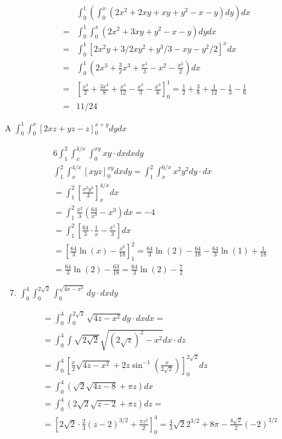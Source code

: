 \documentclass[12pt, a4paper]{article}
\begin{document}
$$
\begin{aligned}
& \int_{0}^{1}\left(\int_{0}^{x}\left(2 x^{2}+2 x y+x y+y^{2}-x-y\right) d y\right) d x \\
= & \int_{0}^{1} \int_{0}^{x}\left(2 x^{2}+3 x y+y^{2}-x-y\right) d y d x \\
= & \int_{0}^{1}\left[2 x^{2} y+3 / 2 x y^{2}+y^{3} / 3-x y-y^{2} / 2\right]^{x} d x \\
= & \int_{0}^{1}\left(2 x^{3}+\frac{3}{2} x^{3}+\frac{x^{3}}{3}-x^{2}-\frac{x^{2}}{2}\right) d x \\
= & {\left[\frac{x^{4}}{2}+\frac{3 x^{4}}{8}+\frac{x^{4}}{12}-\frac{x^{3}}{3}-\frac{x^{3}}{6}\right]_{0}^{1}=\frac{1}{2}+\frac{3}{8}+\frac{1}{12}-\frac{1}{3}-\frac{1}{6} } \\
= & 11 / 24
\end{aligned}
$$

A $\int_{0}^{1} \int_{0}^{x}[2 x z+y z-z]_{0}^{x+y} d y d x$


\begin{align*}
& 6 \int_{1}^{2} \int_{x}^{4 / x} \int_{0}^{x y} x y \cdot d x d x d y \\
& \int_{1}^{2} \int_{x}^{4 / x}[x y z]_{0}^{x y} d x d y=\int_{1}^{2} \int_{x}^{6 / x} x^{2} y^{2} d y \cdot d x \\
&= \int_{1}^{2}\left[\frac{x^{2} y^{3}}{3}\right]_{x}^{4 / x} d x \\
&=\int_{1}^{2} \frac{x^{2}}{3}\left(\frac{64}{x^{3}}-x^{3}\right) d x=-4 \\
&=\int_{1}^{2}\left[\frac{64}{3} \cdot \frac{1}{x}-\frac{x^{5}}{3}\right] d x \\
&=\left[\frac{64}{3} \ln (x)-\frac{x^{6}}{18}\right]_{1}^{2}=\frac{64}{3} \ln (2)-\frac{64}{18}-\frac{64}{3} \ln (1)+\frac{1}{18} \\
&=\frac{64}{3} \ln (2)-\frac{63}{18}=\frac{64}{3} \ln (2)-\frac{7}{2}
\end{align*}


\begin{enumerate}
  \setcounter{enumi}{6}
  \item $\int_{0}^{4} \int_{0}^{2 \sqrt{2}} \int_{0}^{\sqrt{4 x-x^{2}}} d y \cdot d x d y$
\end{enumerate}

$$
\begin{aligned}
& =\int_{0}^{4} \int_{0}^{2 \sqrt{2}} \sqrt{4 z-x^{2}} d y \cdot d x d x= \\
& =\int_{0}^{4} \int \sqrt{2 \sqrt{2}} \sqrt{(2 \sqrt{z})^{2}-x^{2}} d x \cdot d z \\
& =\int_{0}^{4}\left[\frac{x}{2} \sqrt{4 z-x^{2}}+2 z \sin ^{-1}\left(\frac{x}{2 \sqrt{2}}\right)\right]_{0}^{2 \sqrt{2}} d z \\
& =\int_{0}^{4}(\sqrt{2} \sqrt{4 z-8}+\pi z) d x \\
& =\int_{0}^{4}(2 \sqrt{2} \sqrt{z-2}+\pi z) d z= \\
& =\left[2 \sqrt{2} \cdot \frac{2}{3}(z-2)^{3 / 2}+\frac{\pi z^{2}}{2}\right]_{0}^{4}=\frac{4}{3} \sqrt{2} 2^{3 / 2}+8 \pi-\frac{4 \sqrt{2}}{2}(-2)^{3 / 2}
\end{aligned}
$$
\end{document}
